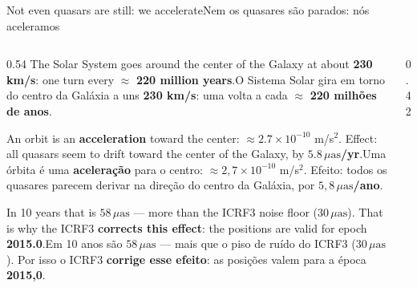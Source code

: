 \documentclass[aspectratio=169,11pt]{beamer}
\newcommand{\tr}[2]{\ifEN#2\else#1\fi}
\newcommand{\bnum}[1]{\textbf{\textcolor{mTeal}{#1}}}
\newcommand{\uas}{\ensuremath{\,\mu\mathrm{as}}\xspace}
\begin{document}
\begin{frame}{\tr{Nem os quasares são parados: nós aceleramos}{Not even quasars are still: we accelerate}}
  \begin{columns}[T]
    \begin{column}{0.54\textwidth}
      \small
      \tr{O Sistema Solar gira em torno do centro da Galáxia a uns \bnum{230 km/s}: uma volta a cada
      $\approx$ \bnum{220 milhões de anos}.}{The Solar System goes around the center of the Galaxy
      at about \bnum{230 km/s}: one turn every $\approx$ \bnum{220 million years}.}
      \medskip

      \tr{Uma órbita é uma \bnum{aceleração} para o centro: $\approx 2{,}7\times10^{-10}$ m/s$^2$.
      Efeito: todos os quasares parecem derivar na direção do centro da Galáxia, por
      \bnum{$5{,}8\uas$/ano}.}{An orbit is an \bnum{acceleration} toward the center: $\approx
      2.7\times10^{-10}$ m/s$^2$. Effect: all quasars seem to drift toward the center of the Galaxy,
      by \bnum{$5.8\uas$/yr}.}
      \medskip

      \tr{Em 10 anos são $58\uas$ --- mais que o piso de ruído do ICRF3 ($30\uas$). Por isso o
      ICRF3 \bnum{corrige esse efeito}: as posições valem para a época \bnum{2015,0}.}{In 10 years
      that is $58\uas$ --- more than the ICRF3 noise floor ($30\uas$). That is why the ICRF3
      \bnum{corrects this effect}: the positions are valid for epoch \bnum{2015.0}.}
    \end{column}
    \begin{column}{0.42\textwidth}
      \centering
    \end{column}
  \end{columns}
\end{frame}
\end{document}
